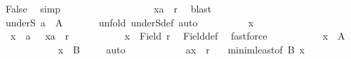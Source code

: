 \begin{isabellebody}
\ False\ \isamarkupfalse%
\ simp\isanewline
\ \ \ \ \ \ \ \ \isacommand{{\isacharbraceright}{\kern0pt}}\isamarkupfalse%
\isanewline
\ \ \ \ \ \ \ \ \isamarkupfalse%
\ {\isachardoublequoteopen}{\isacharparenleft}{\kern0pt}x{\isacharcomma}{\kern0pt}{\isacharquery}{\kern0pt}a{\isacharparenright}{\kern0pt}\ {\isasymin}\ r{\isachardoublequoteclose}\ \isamarkupfalse%
\ blast\isanewline
\ \ \ \ \ \ \isamarkupfalse%
\isanewline
\ \ \ \ \isamarkupfalse%
\isanewline
\ \ \ \ \ \ \isamarkupfalse%
\ {\isachardoublequoteopen}underS\ {\isacharquery}{\kern0pt}a\ {\isasymle}\ A{\isachardoublequoteclose}\isanewline
\ \ \ \ \ \ \isamarkupfalse%
{\isacharparenleft}{\kern0pt}unfold\ underS{\isacharunderscore}{\kern0pt}def{\isacharcomma}{\kern0pt}\ auto{\isacharparenright}{\kern0pt}\isanewline
\ \ \ \ \ \ \ \ \isamarkupfalse%
\ x\isanewline
\ \ \ \ \ \ \ \ \isamarkupfalse%
\ {\isacharasterisk}{\kern0pt}{\isacharasterisk}{\kern0pt}{\isacharcolon}{\kern0pt}\ {\isachardoublequoteopen}x\ {\isasymnoteq}\ {\isacharquery}{\kern0pt}a{\isachardoublequoteclose}\ \ {\isacharasterisk}{\kern0pt}{\isacharasterisk}{\kern0pt}{\isacharasterisk}{\kern0pt}{\isacharcolon}{\kern0pt}\ {\isachardoublequoteopen}{\isacharparenleft}{\kern0pt}x{\isacharcomma}{\kern0pt}{\isacharquery}{\kern0pt}a{\isacharparenright}{\kern0pt}\ {\isasymin}\ r{\isachardoublequoteclose}\isanewline
\ \ \ \ \ \ \ \ \isamarkupfalse%
\ {}{}{\isacharcolon}{\kern0pt}\ {\isachardoublequoteopen}x\ {\isasymin}\ Field\ r{\isachardoublequoteclose}\ \isamarkupfalse%
\ Field{\isacharunderscore}{\kern0pt}def\ \isamarkupfalse%
\ fastforce\isanewline
\ \ \ \ \ \ \ \ \ \isacommand{{\isacharbraceleft}{\kern0pt}}\isamarkupfalse%
\isamarkupfalse%
\ {\isachardoublequoteopen}x\ {\isasymnotin}\ A{\isachardoublequoteclose}\isanewline
\ \ \ \ \ \ \ \ \ \ \isamarkupfalse%
\ {\isachardoublequoteopen}x\ {\isasymin}\ {\isacharquery}{\kern0pt}B{\isachardoublequoteclose}\ \isamarkupfalse%
\ {}{}\ \isamarkupfalse%
\ auto\isanewline
\ \ \ \ \ \ \ \ \ \ \isamarkupfalse%
\ {\isachardoublequoteopen}{\isacharparenleft}{\kern0pt}{\isacharquery}{\kern0pt}a{\isacharcomma}{\kern0pt}x{\isacharparenright}{\kern0pt}\ {\isasymin}\ r{\isachardoublequoteclose}\ \isamarkupfalse%
\ {}\ minim{\isacharunderscore}{\kern0pt}least{\isacharbrackleft}{\kern0pt}of\ {\isacharquery}{\kern0pt}B\ x{\isacharbrackright}{\kern0pt}\ \isamarkupfalse%

\end{isabellebody}
